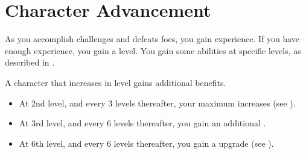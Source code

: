 \section{Character Advancement}\label{Character Advancement}

    As you accomplish challenges and defeats foes, you gain experience.
    If you have enough experience, you gain a level.
    You gain some abilities at specific levels, as described in .

    A character that increases in level gains additional benefits.
    \begin{itemize}
        \item At 2nd level, and every 3 levels thereafter, your maximum  increases (see ).
        \item At 3rd level, and every 6 levels thereafter, you gain an additional .
        \item At 6th level, and every 6 levels thereafter, you gain a  upgrade (see ).
    \end{itemize}

